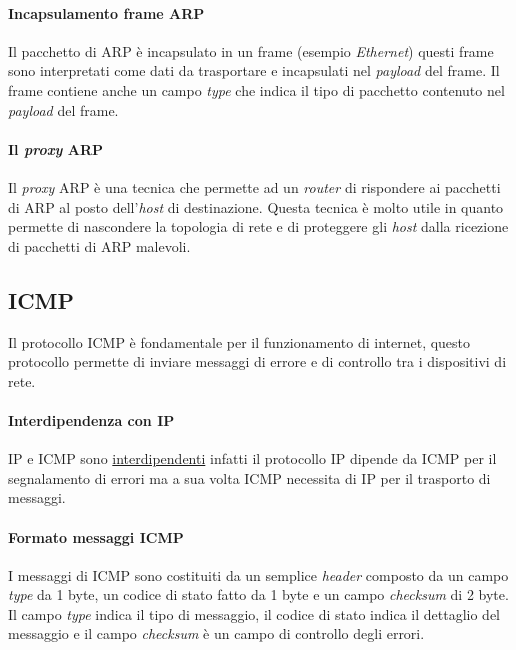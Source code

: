         \paragraph{Incapsulamento frame \Acrshort*{ARP}} Il pacchetto di \Acrshort*{ARP} è incapsulato in un frame (esempio \textit{Ethernet}) questi frame sono interpretati come dati da trasportare e incapsulati nel \textit{payload} del frame. Il frame contiene anche un campo \textit{type} che indica il tipo di pacchetto contenuto nel \textit{payload} del frame.
        \paragraph{Il \textit{proxy} \Acrshort*{ARP}} Il \textit{proxy} \Acrshort*{ARP} è una tecnica che permette ad un \textit{router} di rispondere ai pacchetti di \Acrshort*{ARP} al posto dell'\textit{host} di destinazione. Questa tecnica è molto utile in quanto permette di nascondere la topologia di rete e di proteggere gli \textit{host} dalla ricezione di pacchetti di \Acrshort*{ARP} malevoli.
    \subsection[\textit{Internet Control Message Protocol} (\texttt{ICMP})]{\Acrfull*{ICMP}}
        Il protocollo \Acrshort*{ICMP} è fondamentale per il funzionamento di internet, questo protocollo permette di inviare messaggi di errore e di controllo tra i dispositivi di rete.
        \paragraph{Interdipendenza con \Acrshort*{IP}}\Acrshort*{IP} e \Acrshort*{ICMP} sono \underline{interdipendenti} infatti il protocollo \Acrshort*{IP} dipende da \Acrshort*{ICMP} per il segnalamento di errori ma a sua volta \Acrshort*{ICMP} necessita di \Acrshort*{IP} per il trasporto di messaggi.
        \paragraph{Formato messaggi \Acrshort*{ICMP}} I messaggi di \Acrshort*{ICMP} sono costituiti da un semplice \textit{header} composto da un campo \textit{type} da 1 byte, un codice di stato fatto da 1 byte e un campo \textit{checksum} di 2 byte. Il campo \textit{type} indica il tipo di messaggio, il codice di stato indica il dettaglio del messaggio e il campo \textit{checksum} è un campo di controllo degli errori.
